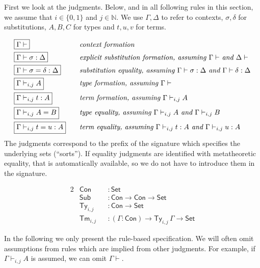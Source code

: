 \documentclass[acmsmall,screen,nonacm]{acmart}
\newcommand{\msf}[1]{\mathsf{#1}}
\newcommand{\Con}{\msf{Con}}
\newcommand{\Sub}{\msf{Sub}}
\newcommand{\Ty}{\msf{Ty}}
\newcommand{\Tm}{\msf{Tm}}
\newcommand{\Set}{\mathsf{Set}}
\theoremstyle{remark}
\begin{document}
First we look at the judgments. Below, and in all following rules in this
section, we assume that $i \in \{0,1\}$ and $j \in \mathbb{N}$. We use $\Gamma,\Delta$ to
refer to contexts, $\sigma,\delta$ for substitutions, $A,B,C$ for types and $t,u,v$ for terms.

\begin{alignat*}{2}
  & \boxed{\Gamma\vdash}\hspace{6em}           && \text{\emph{context formation}}\\
  & \boxed{\Gamma\vdash \sigma : \Delta}       && \text{\emph{explicit substitution formation, assuming $\Gamma \vdash$ and $\Delta \vdash$}}\\
  & \boxed{\Gamma \vdash \sigma = \delta : \Delta} && \text{\emph{substitution equality, assuming $\Gamma \vdash \sigma : \Delta$ and $\Gamma \vdash \delta : \Delta$}}\\
  & \boxed{\Gamma\vdash_{i,j} A}                && \text{\emph{type formation, assuming $\Gamma\vdash$}}\\
  & \boxed{\Gamma\vdash_{i,j} t : A}            && \text{\emph{term formation, assuming $\Gamma \vdash_{i,j} A$}}\\
  & \boxed{\Gamma \vdash_{i,j} A = B}           && \text{\emph{type equality, assuming $\Gamma \vdash_{i,j} A$ and $\Gamma \vdash_{i,j} B$}}\\
  & \boxed{\Gamma \vdash_{i,j} t = u : A}       && \text{\emph{term equality, assuming $\Gamma \vdash_{i,j} t : A$ and $\Gamma \vdash_{i,j} u : A$}}
\end{alignat*}
\newline
\noindent The judgments correspond to the prefix of the signature which specifies the underlying sets (``sorts''). If equality judgments are identified with metatheoretic equality, that is automatically available, so we do not have to introduce them in the signature.

\begin{alignat*}{2}
  & \Con &&: \Set \\
  & \Sub &&: \Con \to \Con \to \Set \\
  & \Ty_{i,j}  &&: \Con \to \Set \\
  & \Tm_{i,j}  &&: (\Gamma : \Con) \to \Ty_{i,j}\,\Gamma \to \Set
\end{alignat*}

In the following we only present the rule-based specification. We will
often omit assumptions from rules which are implied from other judgments. For
example, if $\Gamma \vdash_{i,j} A$ is assumed, we can omit $\Gamma \vdash$.
\end{document}
